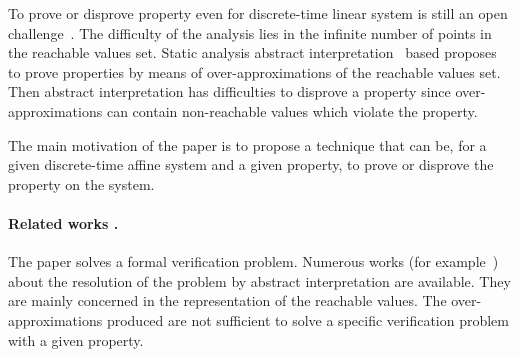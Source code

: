 \documentclass[10pt]{article}
\begin{document}
To prove or disprove property even for discrete-time linear system is still an open challenge~\cite{acceleration-popl14,7403149,DBLP:conf/icalp/AlmagorCO018}.  The difficulty of the analysis lies in the infinite number of points in the reachable values set. Static analysis abstract interpretation~\cite{cousot2001abstract} based proposes to prove properties by means of over-approximations of the reachable values set. Then abstract interpretation has difficulties to disprove a property since over-approximations can contain non-reachable values which violate the property.

The main motivation of the paper is to propose a technique that can be, for a given discrete-time affine system and a given property, to prove or disprove the property on the system. 


\paragraph{Related works .}
%
The paper solves a formal verification problem. Numerous works (for example~\cite{DBLP:journals/corr/abs-1111-5223,gonnord2014abstract,mine-ESOP16,Sankaranarayanan_BenSassi__2017__Template}) about the resolution of the problem by abstract interpretation are available. They are mainly concerned in the representation of the reachable values. The over-approximations produced are not sufficient to solve a specific verification problem with a given property.
\end{document}
